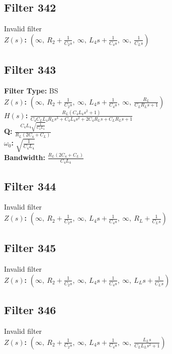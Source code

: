 \documentclass{article}
\begin{document}
\subsection*{Filter 342}
Invalid filter \\ 
\textbf{$Z(s)$:} $\left( \infty, \  R_{2} + \frac{1}{C_{2} s}, \  \infty, \  L_{4} s + \frac{1}{C_{4} s}, \  \infty, \  \frac{1}{C_{L} s}\right)$ \\ 
\subsection*{Filter 343}
\textbf{Filter Type:} BS \\ 
\textbf{$Z(s)$:} $\left( \infty, \  R_{2} + \frac{1}{C_{2} s}, \  \infty, \  L_{4} s + \frac{1}{C_{4} s}, \  \infty, \  \frac{R_{L}}{C_{L} R_{L} s + 1}\right)$ \\ 
\textbf{$H(s)$:} $\frac{R_{L} \left(C_{4} L_{4} s^{2} + 1\right)}{C_{4} C_{L} L_{4} R_{L} s^{3} + C_{4} L_{4} s^{2} + 2 C_{4} R_{L} s + C_{L} R_{L} s + 1}$ \\ 
\textbf{Q:} $\frac{C_{4} L_{4} \sqrt{\frac{1}{C_{4} L_{4}}}}{R_{L} \left(2 C_{4} + C_{L}\right)}$ \\ 
\textbf{$\omega_0$:} $\sqrt{\frac{1}{C_{4} L_{4}}}$ \\ 
\textbf{Bandwidth:} $\frac{R_{L} \left(2 C_{4} + C_{L}\right)}{C_{4} L_{4}}$ \\ 
\subsection*{Filter 344}
Invalid filter \\ 
\textbf{$Z(s)$:} $\left( \infty, \  R_{2} + \frac{1}{C_{2} s}, \  \infty, \  L_{4} s + \frac{1}{C_{4} s}, \  \infty, \  R_{L} + \frac{1}{C_{L} s}\right)$ \\ 
\subsection*{Filter 345}
Invalid filter \\ 
\textbf{$Z(s)$:} $\left( \infty, \  R_{2} + \frac{1}{C_{2} s}, \  \infty, \  L_{4} s + \frac{1}{C_{4} s}, \  \infty, \  L_{L} s + \frac{1}{C_{L} s}\right)$ \\ 
\subsection*{Filter 346}
Invalid filter \\ 
\textbf{$Z(s)$:} $\left( \infty, \  R_{2} + \frac{1}{C_{2} s}, \  \infty, \  L_{4} s + \frac{1}{C_{4} s}, \  \infty, \  \frac{L_{L} s}{C_{L} L_{L} s^{2} + 1}\right)$ \\ 
\end{document}
